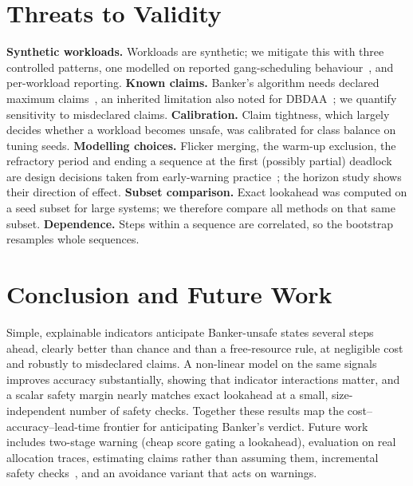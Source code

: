\documentclass[conference]{IEEEtran}
\begin{document}
\section{Threats to Validity}
\textbf{Synthetic workloads.} Workloads are synthetic; we mitigate this with three controlled patterns, one modelled on reported gang-scheduling behaviour~\cite{Jayaram2019FfDL}, and per-workload reporting. \textbf{Known claims.} Banker's algorithm needs declared maximum claims~\cite{Dijkstra-EWD623}, an inherited limitation also noted for DBDAA~\cite{Zohora2024}; we quantify sensitivity to misdeclared claims. \textbf{Calibration.} Claim tightness, which largely decides whether a workload becomes unsafe, was calibrated for class balance on tuning seeds. \textbf{Modelling choices.} Flicker merging, the warm-up exclusion, the refractory period and ending a sequence at the first (possibly partial) deadlock are design decisions taken from early-warning practice~\cite{Hyland2020,Tatbul2018}; the horizon study shows their direction of effect. \textbf{Subset comparison.} Exact lookahead was computed on a seed subset for large systems; we therefore compare all methods on that same subset. \textbf{Dependence.} Steps within a sequence are correlated, so the bootstrap resamples whole sequences.

\section{Conclusion and Future Work}
Simple, explainable indicators anticipate Banker-unsafe states several steps ahead, clearly better than chance and than a free-resource rule, at negligible cost and robustly to misdeclared claims. A non-linear model on the same signals improves accuracy substantially, showing that indicator interactions matter, and a scalar safety margin nearly matches exact lookahead at a small, size-independent number of safety checks. Together these results map the cost--accuracy--lead-time frontier for anticipating Banker's verdict. Future work includes two-stage warning (cheap score gating a lookahead), evaluation on real allocation traces, estimating claims rather than assuming them, incremental safety checks~\cite{Belik1987,Finkel1987,Zohora2024}, and an avoidance variant that acts on warnings.



\end{document}

